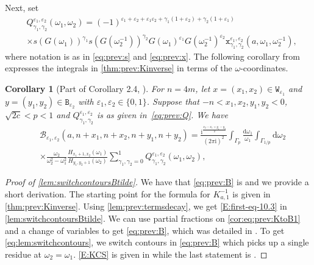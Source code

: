 \documentclass[11pt,twoside]{amsart}
\theoremstyle{plain}
\newtheorem{cor}[thm]{Corollary}
\numberwithin{quest}{section}
\theoremstyle{remark}
\numberwithin{rem}{section}
\theoremstyle{definition}
\newcommand{\eps}{\varepsilon}
\begin{document}
	Next, set
	\begin{equation}
		\begin{split} \label{eq:prev:Q}
			&Q_{\gamma_1,\gamma_2}^{\eps_1,\eps_2} \left( \omega_1,\omega_2 \right) = (-1)^{\eps_1 +\eps_2 +\eps_1 \eps_2 +\gamma_1 (1+\eps_2) +\gamma_2(1+\eps_1) } \\&
			\times s\left( G\left( \omega_1 \right)\right)^{\gamma_1}   s \left( G\left( \omega_2^{-1} \right)\right)^{\gamma_2} G\left( \omega_1 \right) ^{\eps_1} G\left( \omega_2^{-1}  \right)^{\eps_2} \mathtt{x}^{\eps_1,\eps_2}_{\gamma_1,\gamma_2} \left( a, \omega_1 , \omega_2^{-1}\right),
		\end{split}
	\end{equation}
    where notation is as in \eqref{eq:prev:s} and \eqref{eq:prev:x}. The following corollary from \cite{CJ16} expresses the integrals in \cref{thm:prev:Kinverse} in terms of the $\omega$-coordinates. 
    
	\begin{cor}[Part of Corollary 2.4, \cite{CJ16}] \label{cor:prev:KtoB}
		For $n=4m$, let $x=(x_1,x_2) \in \mathtt{W}_{\eps_1}$ and $y=(y_1,y_2) \in \mathtt{B}_{\eps_2}$ with $\eps_1,\eps_2 \in \{0,1\}$.  Suppose that  $-n < x_1,x_2,y_1,y_2 < 0$, $\sqrt{2c}<p<1$ and  $Q^{\eps_1,\eps_2}_{\gamma_1,\gamma_2}$ is as given in~\eqref{eq:prev:Q}. We have
		\begin{equation}
			\begin{split}
				~\label{cor:eq:prev:KtoB1}
				&\mathcal{B}_{\eps_1,\eps_2} (a,n+x_1,n+x_2,n+y_1,n+y_2) =  \frac{ \mathrm{i}^{\frac{x_2-x_1+y_1-y_2}{2}}}{(2\pi \mathrm{i})^2}  \int_{\Gamma_{p}}\frac{\mathrm{d} \omega_1}{\omega_1} \int_{\Gamma_{1/p}}  \mathrm{d} \omega_2 \\ & \times\frac{\omega_2  }{\omega_2^2-\omega_1^2}  \frac{ H_{x_1+1,x_2}(\omega_1)}{H_{y_1,y_2+1}(\omega_2)} \sum_{\gamma_1,\gamma_2=0}^1 Q_{\gamma_1,\gamma_2}^{\eps_1,\eps_2}(\omega_1 ,\omega_2),
			\end{split}
		\end{equation}
		
			\end{cor}
	
	\begin{proof}[Proof of \cref{lem:switchcontoursBtilde}]
    We have that \eqref{eq:prev:B} is \cite[Equation (3.11)]{CJ16} and we provide a short derivation. 
		The starting point for the formula for $K^{-1}_{a,1}$ is given in \cref{thm:prev:Kinverse}. Using \cref{lem:prev:termsdecay}, we get \eqref{E:first-eq-10.3} in \cref{lem:switchcontoursBtilde}.  We can use partial fractions on \eqref{cor:eq:prev:KtoB1} and a change of variables to get \eqref{eq:prev:B}, which was detailed in \cite[Corollary 2.4 and Eq. (3.11)]{CJ16}.  
		To get \eqref{eq:lem:switchcontours}, we switch contours in \eqref{eq:prev:B} which picks up a single residue at $\omega_2=\omega_1$.  \cref{E:KCS} is given in \cite[Lemma 3.3]{CJ16} while the last statement is \cite[Lemma 2.5]{CJ16}.
	\end{proof}
	
\end{document}
